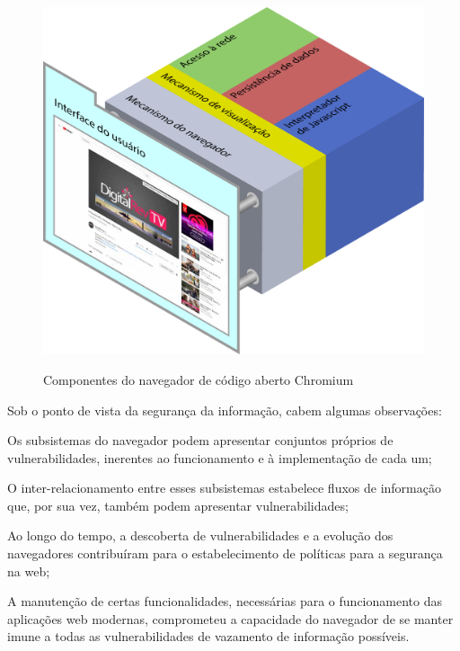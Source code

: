 
\begin{figure}[h]
	\centering
	\includegraphics[width=12cm]{diagramas/diagrama03.pdf}
	\label{Fig: diagrama03}
	\caption{Componentes do navegador de código aberto Chromium}
\end{figure}

Sob o ponto de vista da segurança da informação, cabem algumas observações:

\begin{alineas}
	\item Os subsistemas do navegador podem apresentar conjuntos próprios de vulnerabilidades, inerentes ao funcionamento e à implementação de cada um;
	\item O inter-relacionamento entre esses subsistemas estabelece fluxos de informação que, por sua vez, também podem apresentar vulnerabilidades;
	\item Ao longo do tempo, a descoberta de vulnerabilidades e a evolução dos navegadores contribuíram para o estabelecimento de políticas para a segurança na web;
	\item A manutenção de certas funcionalidades, necessárias para o funcionamento das aplicações web modernas, comprometeu a capacidade do navegador de se manter imune a todas as vulnerabilidades de vazamento de informação possíveis.
\end{alineas}

